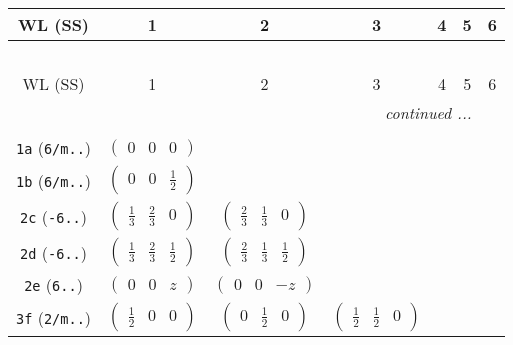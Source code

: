 \documentclass[fleqn,9pt,landscape]{jsarticle}
\begin{document}
\begin{center}
\renewcommand{\arraystretch}{1.2}
\begin{longtable}{ccccccc}
 \hline \hline
WL (SS) & 1 & 2 & 3 & 4 & 5 & 6 \\ \hline \endfirsthead

\multicolumn{6}{l}{\tablename\ \thetable{}} \\
 \hline \hline
WL (SS) & 1 & 2 & 3 & 4 & 5 & 6 \\ \hline \endhead

 \hline \hline
\multicolumn{6}{r}{\footnotesize\it continued ...} \\ \endfoot

 \hline \hline
\multicolumn{6}{r}{} \\ \endlastfoot

{\tt 1a} ({\tt 6/m..}) & $ \begin{pmatrix} 0 & 0 & 0 \end{pmatrix} $ & $  $ & $  $ & $  $ & $  $ & $  $ \\ \hline
{\tt 1b} ({\tt 6/m..}) & $ \begin{pmatrix} 0 & 0 & \frac{1}{2} \end{pmatrix} $ & $  $ & $  $ & $  $ & $  $ & $  $ \\ \hline
{\tt 2c} ({\tt -6..}) & $ \begin{pmatrix} \frac{1}{3} & \frac{2}{3} & 0 \end{pmatrix} $ & $ \begin{pmatrix} \frac{2}{3} & \frac{1}{3} & 0 \end{pmatrix} $ & $  $ & $  $ & $  $ & $  $ \\ \hline
{\tt 2d} ({\tt -6..}) & $ \begin{pmatrix} \frac{1}{3} & \frac{2}{3} & \frac{1}{2} \end{pmatrix} $ & $ \begin{pmatrix} \frac{2}{3} & \frac{1}{3} & \frac{1}{2} \end{pmatrix} $ & $  $ & $  $ & $  $ & $  $ \\ \hline
{\tt 2e} ({\tt 6..}) & $ \begin{pmatrix} 0 & 0 & z \end{pmatrix} $ & $ \begin{pmatrix} 0 & 0 & - z \end{pmatrix} $ & $  $ & $  $ & $  $ & $  $ \\ \hline
{\tt 3f} ({\tt 2/m..}) & $ \begin{pmatrix} \frac{1}{2} & 0 & 0 \end{pmatrix} $ & $ \begin{pmatrix} 0 & \frac{1}{2} & 0 \end{pmatrix} $ & $ \begin{pmatrix} \frac{1}{2} & \frac{1}{2} & 0 \end{pmatrix} $ & $  $ & $  $ & $  $ \\ \hline

\end{longtable}
\end{center}
\end{document}
